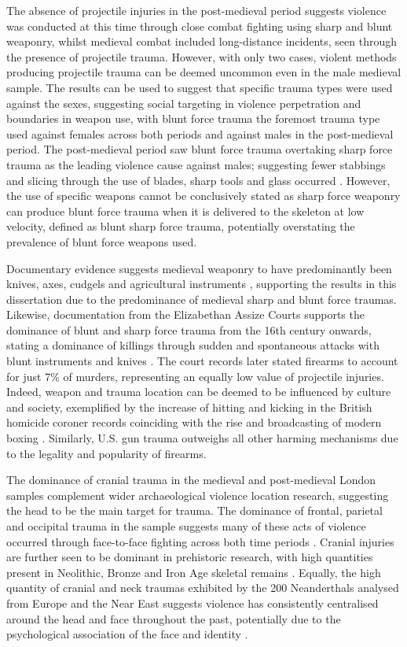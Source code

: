 The absence of projectile injuries in the post-medieval period suggests violence was conducted at this time through close combat fighting using sharp and blunt weaponry, whilst medieval combat included long-distance incidents, seen through the presence of projectile trauma. However, with only two cases, violent methods producing projectile trauma can be deemed uncommon even in the male medieval sample. The results can be used to suggest that specific trauma types were used against the sexes, suggesting social targeting in violence perpetration and boundaries in weapon use, with blunt force trauma the foremost trauma type used against females across both periods and against males in the post-medieval period. The post-medieval period saw blunt force trauma overtaking sharp force trauma as the leading violence cause against males; suggesting fewer stabbings and slicing through the use of blades, sharp tools and glass occurred \parencite{roberts2003}. 
However, the use of specific weapons cannot be conclusively stated as sharp force weaponry can produce blunt force trauma when it is delivered to the skeleton at low velocity, defined as blunt sharp force trauma, potentially overstating the prevalence of blunt force weapons used. 

Documentary evidence suggests medieval weaponry to have predominantly been knives, axes, cudgels and agricultural instruments \parencite{gurr1981}, 
supporting the results in this dissertation due to the predominance of medieval sharp and blunt force traumas. Likewise, documentation from the Elizabethan Assize Courts supports the dominance of blunt and sharp force trauma from the 16th century onwards, stating a dominance of killings through sudden and spontaneous attacks with blunt instruments and knives \parencite{cockburn1977}. 
The court records later stated firearms to account for just 7\% of murders, representing an equally low value of projectile injuries. Indeed, weapon and trauma location can be deemed to be influenced by culture and society, exemplified by the increase of hitting and kicking in the British homicide coroner records coinciding with the rise and broadcasting of modern boxing \parencite{walker1997}. Similarly, U.S. gun trauma outweighs all other harming mechanisms due to the legality and popularity of firearms. 


The dominance of cranial trauma in the medieval and post-medieval London samples complement wider archaeological violence location research, suggesting the head to be the main target for trauma. The dominance of frontal, parietal and occipital trauma in the sample suggests many of these acts of violence occurred through face-to-face fighting across both time periods \parencite{roberts2003}. 
Cranial injuries are further seen to be dominant in prehistoric research, with high quantities present in Neolithic, Bronze and Iron Age skeletal remains \parencite{berger1995}. 
Equally, the high quantity of cranial and neck traumas exhibited by the 200 Neanderthals analysed from Europe and the Near East suggests violence has consistently centralised around the head and face throughout the past, potentially due to the psychological association of the face and identity \parencite{berger1995}. 

